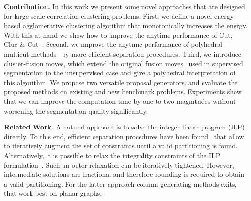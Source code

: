\vspace{0.1cm}
\noindent \textbf{Contribution.}
In this work we present some novel approaches that are designed for large scale correlation clustering problems.
First, we define a novel energy based agglomerative clustering algorithm that monotonically increases the energy.
With this at hand we show how to improve the anytime performance of Cut, Clue \& Cut~\cite{beier_2014_cvpr}.
%
Second, we improve the anytime performance of polyhedral multicut methods~\cite{kappes_2013_arxiv} by more efficient separation procedures.
%
Third, we introduce cluster-fusion moves, which extend the original fusion moves~\cite{Lempitsky-2010} 
used in supervised segmentation to the unsupervised case and give a polyhedral interpretation of this algorithm.
We propose two versatile proposal generators, and evaluate the proposed methods on existing and new benchmark problems.
Experiments show that we can improve the computation time by one to two magnitudes without worsening the segmentation 
quality significantly.
 
\vspace{0.1cm}
\noindent \textbf{Related Work.}
A natural approach is to solve the integer linear program (ILP) directly. 
To this end, efficient separation procedures have been found~\cite{kappes_2011_emmcvpr,kappes_2013_arxiv} that allow to iteratively augment the set of constraints until a valid partitioning is found. 
Alternatively, it is possible to relax the integrality constraints of the ILP formulation~\cite{kappes_2013_arxiv}. 
Such an outer relaxation can be iteratively tightened. However, intermediate solutions are fractional and therefore rounding is required to obtain a valid partitioning.
For the latter approach column generating methods exits, that work best on planar \cite{yarkony_2012_eccv} graphs. %

